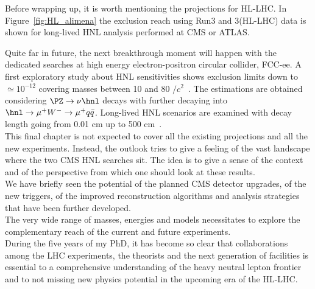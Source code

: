 Before wrapping up, it is worth mentioning the projections for
HL-LHC. In Figure~\ref{fig:HL_alimena} the exclusion reach using Run3
and 3\abinv (HL-LHC) data is shown for long-lived HNL analysis
performed at CMS or ATLAS. 

Quite far in future, the next breakthrough moment will happen with the
dedicated searches at high energy electron-positron circular collider,
FCC-ee. A first exploratory study about HNL sensitivities shows exclusion limits
down to \mixpar $\simeq 10^{-12}$ covering \hnl masses between 10 and
80 \GeV$/c^2$~\cite{blondel2014search}. The estimations are obtained
considering $\PZ \rightarrow \nu \hnl$ decays with \hnl further
decaying into
$\hnl \rightarrow \mu^{+} W^{-} \rightarrow \mu^{+}
q\bar{q}$. Long-lived HNL scenarios are examined with decay length
going from 0.01 cm up to 500 cm~\cite{blondel2014search}.\\


This final chapter is not expected to cover all the existing projections and all the new
experiments. 
Instead, the outlook tries to give a feeling of the vast landscape
where the two CMS HNL searches sit. The idea is to give a sense of the
context and of the perspective from which one should look at these results. \\
We have briefly seen the potential of the planned CMS detector
upgrades, of the new triggers, of the improved reconstruction algorithms and analysis strategies that
have been further developed. \\
The very wide range of masses, energies and models necessitates to
explore the complementary reach of the current and future experiments.\\
During the five years of my PhD, it has become so clear that collaborations
among the LHC experiments, the theorists and the next generation of
facilities is essential to a comprehensive
understanding of the heavy neutral lepton frontier and to not missing
new physics potential in the upcoming era of the HL-LHC.






















